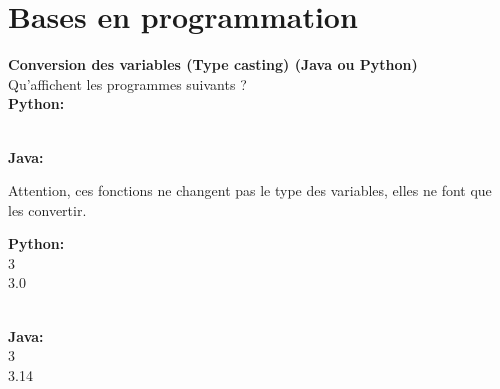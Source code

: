 \section{Bases en programmation}


\begin{Exercice}[5 minutes] \textbf{Conversion des variables (Type casting) (Java ou Python)}\\
   Qu'affichent les programmes suivants ? \\
   
   \textbf{Python:}
   
   
   \textbf{\\Java:}
   
    
   
    \begin{conseil}
      	Attention, ces fonctions ne changent pas le type des variables, elles ne font que les convertir.
        
    \end{conseil}
    \begin{solution}
     
    \textbf{Python:}\\
    3\\
    3.0
    
    \textbf{\\Java:}\\
    3\\
    3.14 \\
           
    \end{solution}   
\end{Exercice}


